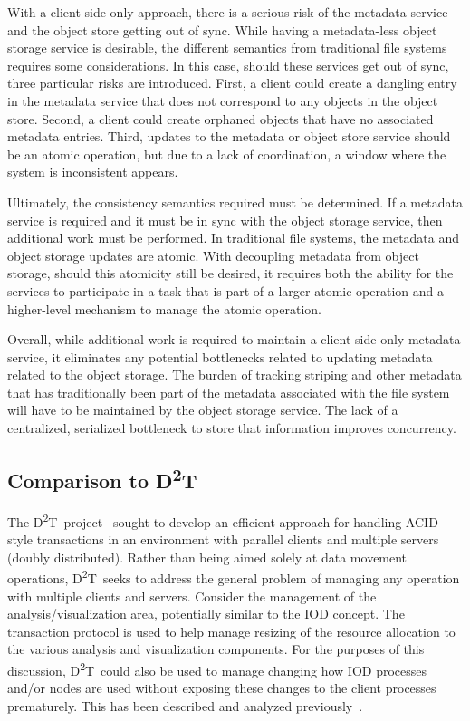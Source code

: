 \documentclass[conference]{IEEEtran}
\newcommand{\DDT}{D\textsuperscript{2}T~}
\newcommand{\DDTns}{D\textsuperscript{2}T}
\begin{document}
With a client-side only approach, there is a serious risk of the metadata
service and the object store getting out of sync.  While having a metadata-less
object storage service is desirable, the different semantics from traditional
file systems requires some considerations. In this case, should these services
get out of sync, three particular risks are introduced.  First, a client could
create a dangling entry in the metadata service that does not correspond to any
objects in the object store. Second, a client could create orphaned objects
that have no associated metadata entries. Third, updates to the metadata or
object store service should be an atomic operation, but due to a lack of
coordination, a window where the system is inconsistent appears.

Ultimately, the consistency semantics required must be determined. If a
metadata service is required and it must be in sync with the object storage
service, then additional work must be performed. In traditional file systems,
the metadata and object storage updates are atomic. With decoupling metadata
from object storage, should this atomicity still be desired, it requires both
the ability for the services to participate in a task that is part of a larger
atomic operation and a higher-level mechanism to manage the atomic operation.

Overall, while additional work is required to maintain a client-side only
metadata service, it eliminates any potential bottlenecks related to updating
metadata related to the object storage. The burden of tracking striping and
other metadata that has traditionally been part of the metadata associated with
the file system will have to be maintained by the object storage service. The
lack of a centralized, serialized bottleneck to store that information improves
concurrency.

\subsection{Comparison to \DDTns}
The \DDT project~\cite{lofstead:2012:txn} sought to develop an efficient
approach for handling ACID-style transactions in an environment with parallel
clients and multiple servers (doubly distributed). Rather than being aimed
solely at data movement operations, \DDT seeks to address the general problem
of managing any operation with multiple clients and servers.  Consider the
management of the analysis/visualization area, potentially similar to the IOD
concept. The transaction protocol is used to help manage resizing of the
resource allocation to the various analysis and visualization components.  For
the purposes of this discussion, \DDT could also be used to manage changing how
IOD processes and/or nodes are used without exposing these changes to the
client processes prematurely.  This has been described and analyzed
previously~\cite{dayal:2013:io-containers}.
\end{document}
